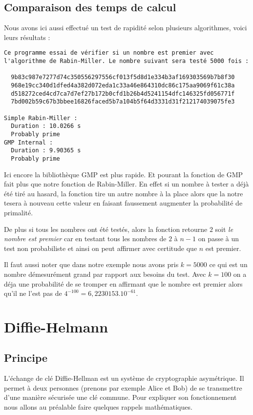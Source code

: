\subsection{Comparaison des temps de calcul}
Nous avons ici aussi effectué un test de rapidité selon plusieurs algorithmes, voici leurs résultats : 

\begin{lstlisting}[language={}]
Ce programme essai de vérifier si un nombre est premier avec l'algorithme de Rabin-Miller. Le nombre suivant sera testé 5000 fois :

  9b83c987e7277d74c350556297556cf013f5d8d1e334b3af169303569b7b8f30
  968e19cc340d1dfed4a382d072eda1c33a46e864310dc86c175aa9069f61c38a
  d518272ced4cd7ca7d7ef27b172b0cfd1b26b4d5241154dfc146325fd056771f
  7bd002b59c67b3bbee16826faced5b7a104b5f64d3331d31f212174039075fe3
  
Simple Rabin-Miller :
  Duration : 10.0266 s
  Probably prime
GMP Internal :
  Duration : 9.90365 s
  Probably prime
\end{lstlisting}

Ici encore la bibliothèque GMP est plus rapide. Et pourant la fonction de GMP fait plus que notre fonction de Rabin-Miller. En effet si un nombre à tester a déjà été tiré au hasard, la fonction tire un autre nombre à la place alors que la notre tesera à nouveau cette valeur en faisant faussement augmenter la probabilité de primalité.

De plus si tous les nombres ont été testés, alors la fonction retourne $2$ soit \textit{le nombre est premier} car en testant tous les nombres de $2$ à $n-1$ on passe à un test non probabiliste et ainsi on peut affirmer avec certitude que $n$ est premier.

Il faut aussi noter que dans notre exemple nous avons pris $k=5000$ ce qui est un nombre démesurément grand par rapport aux besoins du test. Avec $k=100$ on a déja une probabilité de se tromper en affirmant que le nombre est premier alors qu'il ne l'est pas de $4^{-100}=6,2230153.10^{-61}$.

\section{Diffie-Helmann}
\subsection{Principe}

L'échange de clé Diffie-Hellman est un système de cryptographie asymétrique. Il permet à deux personnes (prenons par exemple Alice et Bob) de se transmettre d'une manière sécurisée une clé commune. Pour expliquer son fonctionnement nous allons au préalable faire quelques rappels mathématiques.\\

